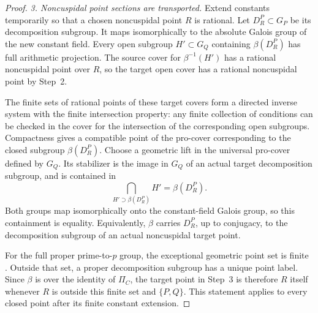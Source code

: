\begin{proof}
\emph{3. Noncuspidal point sections are transported.}
Extend constants temporarily so that a chosen
noncuspidal point \(R\) is rational. Let
\(D_R^P\subset G_P\) be its decomposition subgroup.
It maps isomorphically to the absolute Galois group
of the new constant field. Every open subgroup
\(H'\subset G_Q\) containing \(\beta(D_R^P)\)
has full arithmetic projection. The source cover
for \(\beta^{-1}(H')\) has a rational noncuspidal
point over \(R\), so the target open cover has a
rational noncuspidal point by Step~2.

The finite sets of rational points of these target
covers form a directed inverse system with the
finite intersection property: any finite collection
of conditions can be checked in the cover for the
intersection of the corresponding open subgroups.
Compactness gives a compatible point of the
pro-cover corresponding to the closed subgroup
\(\beta(D_R^P)\). Choose a geometric lift in the
universal pro-cover defined by \(G_Q\). Its
stabilizer is the image in \(G_Q\) of an actual
target decomposition subgroup, and is contained in
\[
        \bigcap_{H'\supset\beta(D_R^P)}H'
                                      =\beta(D_R^P).
\]
Both groups map isomorphically onto the constant-field
Galois group, so this containment is equality.
Equivalently, \(\beta\) carries \(D_R^P\), up to
conjugacy, to the decomposition subgroup of an actual
noncuspidal target point.

For the full proper prime-to-\(p\) group, the
exceptional geometric point set is finite
\cite[Proposition~1.8(vi)]{AR_ST2009}.
Outside that set, a proper decomposition subgroup
has a unique point label. Since \(\beta\) is over
the identity of \(\Pi_C\), the target point in
Step~3 is therefore \(R\) itself whenever \(R\)
is outside this finite set and \(\{P,Q\}\).
This statement applies to every closed point after
its finite constant extension.


\end{proof}
